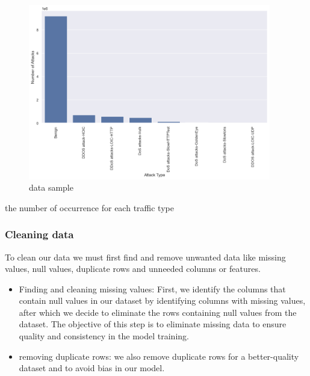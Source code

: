 \begin{figure}[h]
	\centering
	\includegraphics[width=400px]{figures/unbalanced_data.png}
	\caption{data sample}
	\label{fig:unbalanced_data}
\end{figure}

\begin{table}[h]
	\centering
	\caption{the number of occurrence for each traffic type}
	
	\label{tab:unbalanced_data_table} 
\end{table}


\newpage

\subsubsection{Cleaning data}
To clean our data we must first find and remove unwanted data like missing values, null values, duplicate rows and unneeded columns or features.


\firmlist
\begin{itemize}
	\item Finding and cleaning missing values: First, we identify the columns that contain null values in our dataset by identifying columns with missing values, after which we decide to eliminate the rows containing null values from the dataset. The objective of this step is to eliminate missing data to ensure quality and consistency in the model training.
	
	\item removing duplicate rows: we also remove duplicate rows for a better-quality dataset and to avoid bias in our model.
	
\end{itemize}






